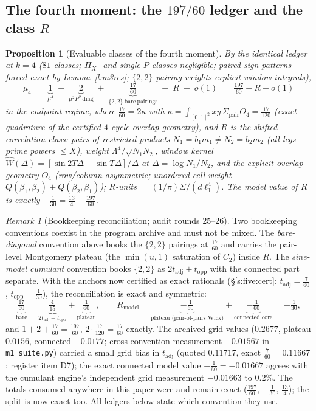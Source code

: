 \documentclass[11pt]{article}
\numberwithin{equation}{section}
\newtheorem{proposition}[theorem]{Proposition}
\theoremstyle{definition}
\theoremstyle{remark}
\newtheorem{remark}[theorem]{Remark}
\newcommand{\LL}{\Lambda}
\begin{document}
\subsection{The fourth moment: the $197/60$ ledger and the class
$R$}\label{s:cert:R}

\begin{proposition}[Evaluable classes of the fourth
moment]\label{p:m4classical}
By the identical ledger at $k=4$ ($81$ classes; $\Pi_X$- and
single-$P$ classes negligible; paired sign patterns forced exact
by Lemma~\ref{l:m3res}; $\{2,2\}$-pairing weights explicit window
integrals),
\[
\mu_4\;=\;\underbrace{1}_{\mu^4}
\;+\;\underbrace{2}_{\mu^2P^2\ \mathrm{diag}}
\;+\;\underbrace{\tfrac{17}{60}}_{\{2,2\}\ \mathrm{bare\
pairings}}\;+\;R\;+\;o(1)\;=\;\tfrac{197}{60}+R+o(1)
\]
in the endpoint regime, where $\tfrac{17}{60}=2\kappa$ with
$\kappa=\int_{[0,1]^2}xy\,\Sigma_{\mathrm{pair}}O_4
=\tfrac{17}{120}$ (exact quadrature of the certified $4$-cycle
overlap geometry), and $R$ is the shifted-correlation class:
pairs of restricted products $N_1=b_1m_1\ne N_2=b_2m_2$ (all legs
prime powers $\le X$), weight $\LL^4/\sqrt{N_1N_2}$, window
kernel $\widehat W(\Delta)=[\sin2T\Delta-\sin T\Delta]/\Delta$ at
$\Delta=\log N_1/N_2$, and the explicit overlap geometry $O_4$
(row/column asymmetric; unordered-cell weight
$Q(\beta_1,\beta_2)+Q(\beta_2,\beta_1)$); $R$-units
$=(1/\pi)\Sigma/(d\ell_1^4)$. The model value of $R$ is exactly
$-\tfrac1{30}=\tfrac{13}4-\tfrac{197}{60}$.
\end{proposition}

\begin{remark}[Bookkeeping reconciliation; audit
rounds 25--26]\label{r:books}
Two bookkeeping conventions coexist in the program archive and
must not be mixed. The \emph{bare-diagonal} convention above
books the $\{2,2\}$ pairings at $\tfrac{17}{60}$ and carries the
pair-level Montgomery plateau (the $\min(u,1)$ saturation of
$C_2$) inside $R$. The \emph{sine-model cumulant} convention
books $\{2,2\}$ as $2t_{\mathrm{adj}}+t_{\mathrm{opp}}$ with the
connected part separate. With the anchors now certified as exact
rationals (\S\ref{s:five:cert}: $t_{\mathrm{adj}}=\tfrac7{60}$,
$t_{\mathrm{opp}}=\tfrac1{30}$), the reconciliation is exact and
symmetric:
\[
\underbrace{\tfrac{17}{60}}_{\text{bare}}
=\underbrace{\tfrac4{15}}_{2t_{\mathrm{adj}}+t_{\mathrm{opp}}}
+\underbrace{\tfrac1{60}}_{\text{plateau}},
\qquad
R_{\mathrm{model}}
=\underbrace{-\tfrac1{60}}_{\text{plateau (pair-of-pairs Wick)}}
+\underbrace{-\tfrac1{60}}_{\text{connected core}}
=-\tfrac1{30},
\]
and $1+2+\tfrac{17}{60}=\tfrac{197}{60}$,
$2\cdot\tfrac{17}{120}=\tfrac{17}{60}$ exactly. The archived
grid values ($0.2677$, plateau $0.0156$, connected $-0.0177$;
cross-convention measurement $-0.01567$ in
\texttt{m1\_suite.py}) carried a small grid bias in
$t_{\mathrm{adj}}$ (quoted $0.11717$, exact $\tfrac7{60}
=0.11667$; register item D7); the exact connected model value
$-\tfrac1{60}=-0.01667$ agrees with the cumulant engine's
independent grid measurement $-0.01663$ to $0.2\%$. The totals
consumed anywhere in this paper were and remain exact
($\tfrac{197}{60}$, $-\tfrac1{30}$, $\tfrac{13}4$); the split is
now exact too. All ledgers below state which convention they use.
\end{remark}
\end{document}
